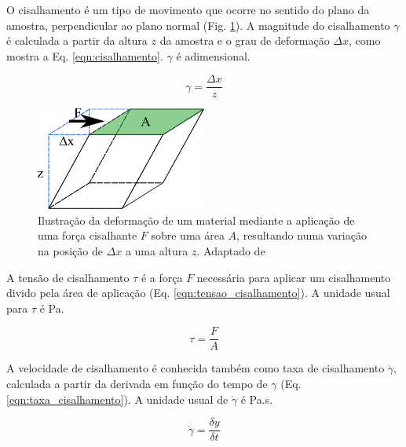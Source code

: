 			O cisalhamento é um tipo de movimento que ocorre no sentido do plano da amostra, perpendicular ao plano normal (Fig. \ref{fig:cisalhamento}). A magnitude do cisalhamento \(\gamma\) é calculada a partir da altura \(z\) da amostra e o grau de deformação \(\Delta x\), como mostra a Eq. \ref{eqn:cisalhamento}. \(\gamma\) é adimensional.
			
			\begin{equation}  
				\gamma = \frac{\Delta x}{z}
				\label{eqn:cisalhamento}
			\end{equation} 
			
			\begin{figure}[h]
				\centering
				\includegraphics[width=0.5\textwidth]{imagens/reologia/cisalhamento}
				\caption{Ilustração da deformação de um material mediante a aplicação de uma força cisalhante \(F\) sobre uma área \(A\), resultando numa variação na posição de \(\Delta x\) a uma altura \(z\). Adaptado de %
				}
				\label{fig:cisalhamento}
			\end{figure} 
			
			A tensão de cisalhamento \(\tau\) é a força \(F\) necessária para aplicar um cisalhamento divido pela área de aplicação (Eq. \ref{eqn:tensao_cisalhamento}). A unidade usual para \(\tau\) é Pa. 
			
			\begin{equation}
				\tau = \frac{F}{A}
				\label{eqn:tensao_cisalhamento}
			\end{equation}
			
			A velocidade de cisalhamento é conhecida também como taxa de cisalhamento \(\dot{\gamma}\), calculada a partir da derivada em função do tempo de \(\gamma\) (Eq. \ref{eqn:taxa_cisalhamento}). A unidade usual de \(\dot{\gamma}\) é Pa.s\menosUm. 
			
			\begin{equation}
				\dot{\gamma} = \dfrac{\delta y}{\delta t}
				\label{eqn:taxa_cisalhamento}
			\end{equation}
			
